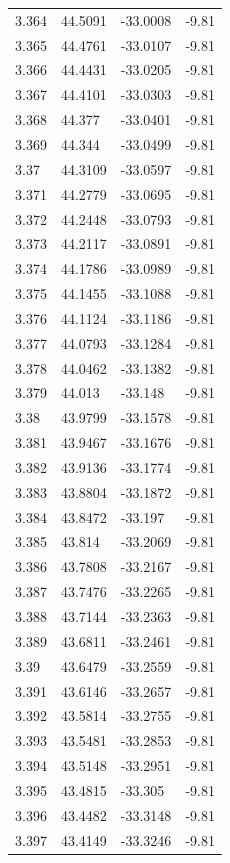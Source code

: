 \begin{tabular}{llll}
3.364 & 44.5091 & -33.0008 & -9.81 \\
3.365 & 44.4761 & -33.0107 & -9.81 \\
3.366 & 44.4431 & -33.0205 & -9.81 \\
3.367 & 44.4101 & -33.0303 & -9.81 \\
3.368 & 44.377 & -33.0401 & -9.81 \\
3.369 & 44.344 & -33.0499 & -9.81 \\
3.37 & 44.3109 & -33.0597 & -9.81 \\
3.371 & 44.2779 & -33.0695 & -9.81 \\
3.372 & 44.2448 & -33.0793 & -9.81 \\
3.373 & 44.2117 & -33.0891 & -9.81 \\
3.374 & 44.1786 & -33.0989 & -9.81 \\
3.375 & 44.1455 & -33.1088 & -9.81 \\
3.376 & 44.1124 & -33.1186 & -9.81 \\
3.377 & 44.0793 & -33.1284 & -9.81 \\
3.378 & 44.0462 & -33.1382 & -9.81 \\
3.379 & 44.013 & -33.148 & -9.81 \\
3.38 & 43.9799 & -33.1578 & -9.81 \\
3.381 & 43.9467 & -33.1676 & -9.81 \\
3.382 & 43.9136 & -33.1774 & -9.81 \\
3.383 & 43.8804 & -33.1872 & -9.81 \\
3.384 & 43.8472 & -33.197 & -9.81 \\
3.385 & 43.814 & -33.2069 & -9.81 \\
3.386 & 43.7808 & -33.2167 & -9.81 \\
3.387 & 43.7476 & -33.2265 & -9.81 \\
3.388 & 43.7144 & -33.2363 & -9.81 \\
3.389 & 43.6811 & -33.2461 & -9.81 \\
3.39 & 43.6479 & -33.2559 & -9.81 \\
3.391 & 43.6146 & -33.2657 & -9.81 \\
3.392 & 43.5814 & -33.2755 & -9.81 \\
3.393 & 43.5481 & -33.2853 & -9.81 \\
3.394 & 43.5148 & -33.2951 & -9.81 \\
3.395 & 43.4815 & -33.305 & -9.81 \\
3.396 & 43.4482 & -33.3148 & -9.81 \\
3.397 & 43.4149 & -33.3246 & -9.81 \\

\end{tabular}
